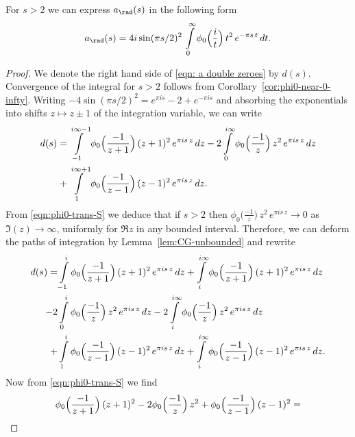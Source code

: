 \begin{proposition}
\label{prop:a-double-zeros}
For $s>2$ we can express $a_\rad(s)$ in the following form
\begin{equation}\label{eqn: a double zeroes}
    a_\rad(s)=4i\sin(\pi s/2)^2\,\int\limits_{0}^{\infty}\phi_0\Big(\frac{i}{t}\Big)\,t^2\,e^{-\pi s \,t}\,dt.
\end{equation}
\end{proposition}
\begin{proof}
We denote the right hand side of \eqref{eqn: a double zeroes} by $d(s)$.
Convergence of the integral for $s > 2$ follows from Corollary~\ref{cor:phi0-near-0-infty}.
Writing $-4\sin(\pi s/2)^2 = e^{\pi i s} - 2 + e^{-\pi i s}$ and absorbing the exponentials into shifts $z \mapsto z \pm 1$ of the integration variable, we can write
\begin{align}
    d(s)=&\int\limits_{-1}^{i\infty-1}\phi_0\Big(\frac{-1}{z+1}\Big)\,(z+1)^2\,e^{\pi i s \,z}\,dz-
    2\int\limits_{0}^{i\infty}\phi_0\Big(\frac{-1}{z}\Big)\,z^2\,e^{\pi i s \,z}\,dz\notag\\
    +&\int\limits_{1}^{i\infty+1}\phi_0\Big(\frac{-1}{z-1}\Big)\,(z-1)^2\,e^{\pi i s \,z}\,dz.\notag
\end{align}
From \eqref{eqn:phi0-trans-S} we deduce that if $s>2$ then
$\phi_0\Big(\frac{-1}{z}\Big)\,z^2\,e^{\pi i s \,z}\to 0$ as $\Im(z)\to\infty$, uniformly for $\Re z$ in any bounded interval. Therefore, we can deform the paths of integration by Lemma~\ref{lem:CG-unbounded}
and rewrite
\begin{align}
    d(s)=&\int\limits_{-1}^{i}\phi_0\Big(\frac{-1}{z+1}\Big)\,(z+1)^2\,e^{\pi i s \,z}\,dz
    +\int\limits_{i}^{i\infty}\phi_0\Big(\frac{-1}{z+1}\Big)\,(z+1)^2\,e^{\pi i s \,z}\,dz\notag\\
    -2&\int\limits_{0}^{i}\phi_0\Big(\frac{-1}{z}\Big)\,z^2\,e^{\pi i s \,z}\,dz
    -2\int\limits_{i}^{i\infty}\phi_0\Big(\frac{-1}{z}\Big)\,z^2\,e^{\pi i s \,z}\,dz\notag\\
    +&\int\limits_{1}^{i}\phi_0\Big(\frac{-1}{z-1}\Big)\,(z-1)^2\,e^{\pi i s \,z}\,dz
    +\int\limits_{i}^{i\infty}\phi_0\Big(\frac{-1}{z-1}\Big)\,(z-1)^2\,e^{\pi i s \,z}\,dz.\notag
\end{align}
Now from \eqref{eqn:phi0-trans-S} we find
\begin{align}&\phi_0\Big(\frac{-1}{z+1}\Big)\,(z+1)^2-2\phi_0\Big(\frac{-1}{z}\Big)\,z^2+
\phi_0\Big(\frac{-1}{z-1}\Big)\,(z-1)^2=\notag\\

\end{align}
\end{proof}
